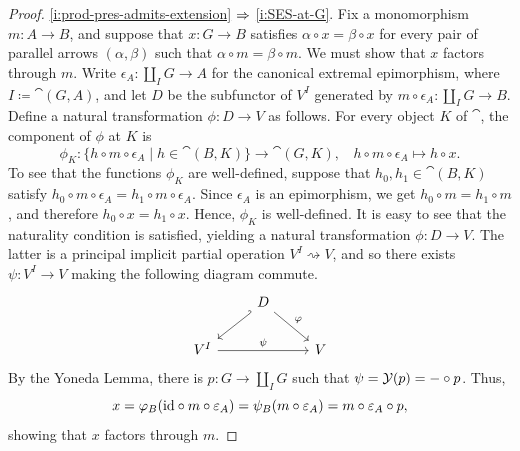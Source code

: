 \documentclass[a4paper,10pt,reqno]{amsart}
\theoremstyle{definition}
\theoremstyle{remark}
\begin{document}
\begin{proof}
\ref{i:prod-pres-admits-extension} $\Rightarrow$ \ref{i:SES-at-G}. Fix a monomorphism $m\colon A\to B$, and suppose that $x\colon G\to B$ satisfies $\alpha\circ x = \beta\circ x$ for every pair of parallel arrows $(\alpha,\beta)$ such that $\alpha\circ m = \beta\circ m$. We must show that $x$ factors through $m$. 
%
Write $\epsilon_{A}\colon \coprod_{I}{G}\to A$ for the canonical extremal epimorphism, where $I\coloneqq \cat(G,A)$, and let $D$ be the subfunctor of $V^{I}$ generated by $m\circ \epsilon_{A}\colon \coprod_{I}{G}\to B$. Define a natural transformation $\phi\colon D\to V$ as follows. For every object $K$ of $\cat$, the component of $\phi$ at $K$ is
\[
\phi_{K}\colon \{h\circ m\circ \epsilon_{A}\mid h\in \cat(B,K)\} \to \cat(G,K), \ \ \ \ h\circ m\circ \epsilon_{A}\mapsto h\circ x.
\]
To see that the functions $\phi_{K}$ are well-defined, suppose that $h_{0},h_{1}\in \cat(B,K)$ satisfy $h_{0}\circ m\circ \epsilon_{A}=h_{1}\circ m\circ \epsilon_{A}$. Since $\epsilon_{A}$ is an epimorphism, we get $h_{0}\circ m=h_{1}\circ m$, and therefore $h_{0}\circ x=h_{1}\circ x$. Hence, $\phi_{K}$ is well-defined. It is easy to see that the naturality condition is satisfied, yielding a natural transformation $\phi\colon D\to V$. The latter is a principal implicit partial operation $V^{I}\rightsquigarrow V$, and so there exists $\psi\colon V^{I}\to V$ making the following diagram commute.
\[\begin{tikzcd}
& D \arrow{dr}{\phi} & \\
V^{I} \arrow{rr}{\psi} \arrow[hookleftarrow]{ur} & & V
\end{tikzcd}\]
%
By the Yoneda Lemma, there is $p\colon G\to \coprod_{I}G$ such that $\psi=\mathcal{Y}(p)=-\circ p$. Thus,
\[
x = \varphi_{B}(\mathrm{id}\circ m\circ \varepsilon_{A}) = \psi_{B}(m\circ \varepsilon_{A}) = m\circ \varepsilon_{A}\circ p,
\]
showing that $x$ factors through $m$. 


\end{proof}
\end{document}
